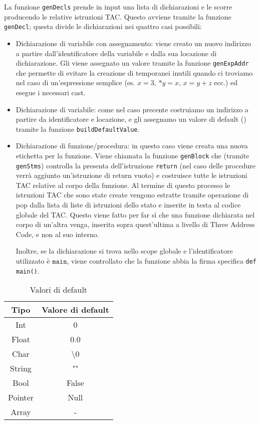 La funzione {\tt genDecls} prende in input una lista di dichiarazioni e le scorre producendo le relative istruzioni TAC. Questo avviene tramite la funzione {\tt genDecl}; questa divide le dichiarazioni nei quattro casi possibili:
\begin{itemize}
    \item Dichiarazione di variabile con assegnamento: viene creato un nuovo indirizzo a partire dall'identificatore della variabile e dalla sua locazione di dichiarazione. Gli viene assegnato un valore tramite la funzione {\tt genExpAddr} che permette di evitare la creazione di temporanei inutili quando ci troviamo nel caso di un'espressione semplice (es. $x = 3$, $*y= x$, $x = y + z$ ecc.) ed esegue i necessari cast.
    \item Dichiarazione di variabile: come nel caso precente costruiamo un indirizzo a partire da identificatore e locazione, e gli assegnamo un valore di default (\label{table:valori_default}) tramite la funzione {\tt buildDefaultValue}.
    \item Dichiarazione di funzione/procedura: in questo caso viene creata una nuova etichetta per la funzione. Viene chiamata la funzione {\tt genBlock} che (tramite {\tt genStms}) controlla la presenta dell'istruzione {\tt return} (nel caso delle procedure verrà aggiunto un'istruzione di return vuoto) e costruisce tutte le istruzioni TAC relative al corpo della funzione. Al termine di questo processo le istruzioni TAC che sono state create vengono estratte tramite operazione di pop dalla lista di liste di istruzioni dello stato e inserite in testa al codice globale del TAC. Questo viene fatto per far sì che una funzione dichiarata nel corpo di un'altra venga, inserita sopra quest'ultima a livello di Three Address Code, e non al suo interno. 
    
    Inoltre, se la dichiarazione si trova nello scope globale e l'identificatore utilizzato è $\texttt{main}$, viene controllato che la funzione abbia la firma specifica {\tt def main()}.
\end{itemize}

\begin{table}
\centering
    \begin{tabular}{|c c|} 
        \hline
        Tipo & Valore di default \\ [0.5ex] 
        \hline\hline
        Int & 0 \\ 
        Float & 0.0  \\
        Char & \textbackslash0 \\
        String &  "" \\
        Bool & False \\ 
        Pointer & Null\\
        Array & - \\[1ex] 
        \hline
    \end{tabular}
    \caption{Valori di default}
    \label{table:valori_default}
\end{table}


